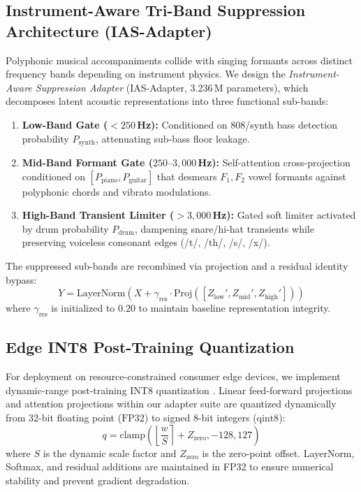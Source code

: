 \subsection{Instrument-Aware Tri-Band Suppression Architecture (IAS-Adapter)}
Polyphonic musical accompaniments collide with singing formants across distinct frequency bands depending on instrument physics. We design the \textit{Instrument-Aware Suppression Adapter} (IAS-Adapter, $3.236$\,M parameters), which decomposes latent acoustic representations into three functional sub-bands:
\begin{enumerate}
    \item \textbf{Low-Band Gate ($<250$\,Hz):} Conditioned on 808/synth bass detection probability $P_{\text{synth}}$, attenuating sub-bass floor leakage.
    \item \textbf{Mid-Band Formant Gate ($250\text{--}3{,}000$\,Hz):} Self-attention cross-projection conditioned on $[P_{\text{piano}}, P_{\text{guitar}}]$ that desmears $F_1, F_2$ vowel formants against polyphonic chords and vibrato modulations.
    \item \textbf{High-Band Transient Limiter ($>3{,}000$\,Hz):} Gated soft limiter activated by drum probability $P_{\text{drum}}$, dampening snare/hi-hat transients while preserving voiceless consonant edges (/t/, /th/, /s/, /x/).
\end{enumerate}
The suppressed sub-bands are recombined via projection and a residual identity bypass:
\begin{equation}
\label{eq:ias_recon}
Y = \text{LayerNorm}(X + \gamma_{\text{res}} \cdot \text{Proj}([Z_{\text{low}}', Z_{\text{mid}}', Z_{\text{high}}']))
\end{equation}
where $\gamma_{\text{res}}$ is initialized to $0.20$ to maintain baseline representation integrity.

\subsection{Edge INT8 Post-Training Quantization}
For deployment on resource-constrained consumer edge devices, we implement dynamic-range post-training INT8 quantization \cite{jacob2018quantization}. Linear feed-forward projections and attention projections within our adapter suite are quantized dynamically from 32-bit floating point ($\text{FP32}$) to signed 8-bit integers ($\text{qint8}$):
\begin{equation}
q = \text{clamp}\left(\left\lfloor \frac{w}{S} \right\rceil + Z_{\text{zero}}, -128, 127\right)
\end{equation}
where $S$ is the dynamic scale factor and $Z_{\text{zero}}$ is the zero-point offset. LayerNorm, Softmax, and residual additions are maintained in FP32 to ensure numerical stability and prevent gradient degradation.


